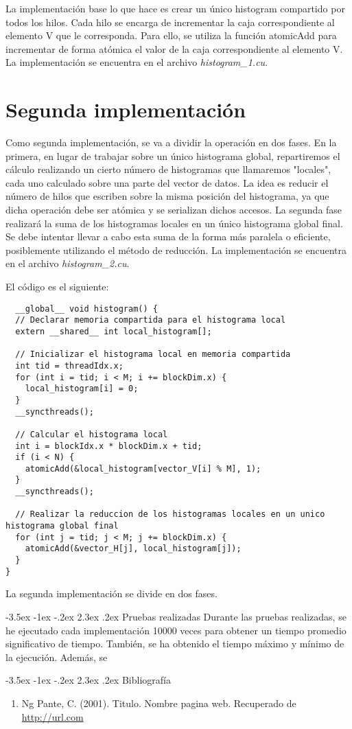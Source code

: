 \documentclass[11pt]{report}
\makeatletter
\renewcommand\chapter{\@startsection{chapter}{0}{\z@}%
    {-3.5ex \@plus -1ex \@minus -.2ex}%
    {2.3ex \@plus.2ex}%
    {\normalfont\Large\bfseries}}
\makeatother
\begin{document}
La implementación base lo que hace es crear un único histogram compartido por todos
los hilos. Cada hilo se encarga de incrementar la caja correspondiente al elemento
V que le corresponda. Para ello, se utiliza la función atomicAdd para incrementar
de forma atómica el valor de la caja correspondiente al elemento V. La implementación
se encuentra en el archivo \textit{histogram\_1.cu}.

\section{Segunda implementación}
Como segunda implementación, se va a dividir la operación en dos fases. En la primera,
en lugar de trabajar sobre un único histograma global, repartiremos el cálculo realizando 
un cierto número de histogramas que llamaremos "locales", cada uno calculado sobre una 
parte del vector de datos. La idea es reducir el número de hilos que escriben sobre la
misma posición del histograma, ya que dicha operación debe ser atómica y se serializan 
dichos accesos. La segunda fase realizará la suma de los histogramas locales en un único
histograma global final. Se debe intentar llevar a cabo esta suma de la forma más paralela
o eficiente, posiblemente utilizando el método de reducción. La implementación se encuentra
en el archivo \textit{histogram\_2.cu}.

El código es el siguiente:
\begin{lstlisting}
  __global__ void histogram() {
  // Declarar memoria compartida para el histograma local
  extern __shared__ int local_histogram[];

  // Inicializar el histograma local en memoria compartida
  int tid = threadIdx.x;
  for (int i = tid; i < M; i += blockDim.x) {
    local_histogram[i] = 0;
  }
  __syncthreads();

  // Calcular el histograma local
  int i = blockIdx.x * blockDim.x + tid;
  if (i < N) {
    atomicAdd(&local_histogram[vector_V[i] % M], 1);
  }
  __syncthreads();

  // Realizar la reduccion de los histogramas locales en un unico histograma global final
  for (int j = tid; j < M; j += blockDim.x) {
    atomicAdd(&vector_H[j], local_histogram[j]);
  }
}
\end{lstlisting}

La segunda implementación se divide en dos fases. 


\chapter{Pruebas realizadas}
Durante las pruebas realizadas, se he ejecutado cada implementación 10000 veces para 
obtener un tiempo promedio significativo de tiempo. También, se ha obtenido el tiempo
máximo y mínimo de la ejecución. Además, se 


\chapter{Bibliografía} %
\begin{enumerate}
\item Ng Pante, C. (2001). Titulo. Nombre pagina web. Recuperado de \url{http://url.com}

\end{enumerate}
\end{document}
